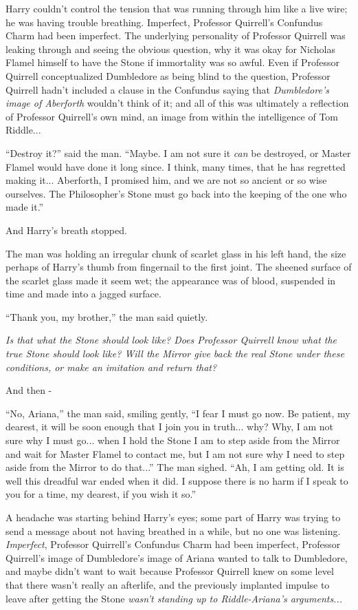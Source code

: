 Harry couldn't control the tension that was running through him like a live wire; he was having trouble breathing. Imperfect, Professor Quirrell's Confundus Charm had been imperfect. The underlying personality of Professor Quirrell was leaking through and seeing the obvious question, why it was okay for Nicholas Flamel himself to have the Stone if immortality was so awful. Even if Professor Quirrell conceptualized Dumbledore as being blind to the question, Professor Quirrell hadn't included a clause in the Confundus saying that \emph{Dumbledore's image of Aberforth} wouldn't think of it; and all of this was ultimately a reflection of Professor Quirrell's own mind, an image from within the intelligence of Tom Riddle...

``Destroy it?'' said the man. ``Maybe. I am not sure it \emph{can} be destroyed, or Master Flamel would have done it long since. I think, many times, that he has regretted making it... Aberforth, I promised him, and we are not so ancient or so wise ourselves. The Philosopher's Stone must go back into the keeping of the one who made it.''

And Harry's breath stopped.

The man was holding an irregular chunk of scarlet glass in his left hand, the size perhaps of Harry's thumb from fingernail to the first joint. The sheened surface of the scarlet glass made it seem wet; the appearance was of blood, suspended in time and made into a jagged surface.

``Thank you, my brother,'' the man said quietly.

\emph{Is that what the Stone should look like? Does Professor Quirrell know what the true Stone should look like? Will the Mirror give back the real Stone under these conditions, or make an imitation and return that?}

And then -

``No, Ariana,'' the man said, smiling gently, ``I fear I must go now. Be patient, my dearest, it will be soon enough that I join you in truth... why? Why, I am not sure why I must go... when I hold the Stone I am to step aside from the Mirror and wait for Master Flamel to contact me, but I am not sure why I need to step aside from the Mirror to do that...'' The man sighed. ``Ah, I am getting old. It is well this dreadful war ended when it did. I suppose there is no harm if I speak to you for a time, my dearest, if you wish it so.''

A headache was starting behind Harry's eyes; some part of Harry was trying to send a message about not having breathed in a while, but no one was listening. \emph{Imperfect}, Professor Quirrell's Confundus Charm had been imperfect, Professor Quirrell's image of Dumbledore's image of Ariana wanted to talk to Dumbledore, and maybe didn't want to wait because Professor Quirrell knew on some level that there wasn't really an afterlife, and the previously implanted impulse to leave after getting the Stone \emph{wasn't standing up to Riddle-Ariana's arguments...}

